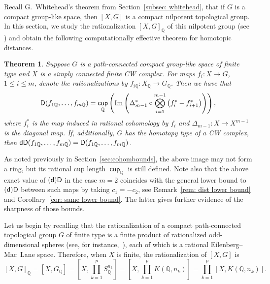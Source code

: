 \documentclass[amscd,amssymb,verbatim,10pt]{amsart}
\numberwithin{equation}{section}
\theoremstyle{plain}
\newtheorem{theorem}{Theorem}[section]
\theoremstyle{definition}
\DeclareMathOperator{\cu}{{\mathsf{cup}}}
\def\Im{\protect\operatorname{Im}}
\def\Q{{\mathbb Q}}
\newcommand{\D}{{\sf {D}}}
\newcommand{\sd}{{(\sf {d})}}
\newcommand{\dD}{{\sf {dD}}}
\begin{document}
Recall G.~Whitehead's theorem from Section~\ref{subsec: whitehead}, that if $G$ is a compact group-like space, then $[X,G]$ is a compact nilpotent topological group. In this section, we study the rationalization $[X,G]_{\Q}$ of this nilpotent group (see \cite{HMR}) and obtain the following computationally effective theorem for homotopic distances.

\begin{theorem}\label{thm:nilfgstar}
Suppose $G$ is a path-connected compact group-like space of finite type and $X$ is a 
simply connected finite CW complex. For maps $f_i\colon X \to G$, $1\le i \le m$, denote
the rationalizations by $f_{i\Q}\colon X_\Q \to G_\Q$. Then we have that
\[
\D(f_{1\Q},\dots,f_{m\Q})=\cu_{\Q}\left(\Im\left(
\Delta_{m-1}^*\circ \bigotimes_{i=1}^{m-1}\left(f_i^*-f_{i+1}^*\right)\right)
\right),
\]
where 
$f_i^*$ is the map induced in rational cohomology by $f_i$ and 
$\Delta_{m-1}\colon X\to X^{m-1}$ is the diagonal map. If, additionally, $G$ has the 
homotopy type of a CW complex, then $\dD(f_{1\Q},\dots,f_{m\Q})=\D(f_{1\Q},\dots,f_{m\Q})$.
\end{theorem}

As noted previously in Section~\ref{sec:cohombounds}, the above image may not form a ring, but its rational cup length $\cu_\Q$ is still defined. Note also that the above exact value of $\sd\D$ in the case $m=2$ coincides with the general lower bound to $\sd\D$ between such maps by taking $c_1=-c_2$, see Remark~\ref{rem: dist lower bound} and Corollary~\ref{cor: same lower bound}. The latter gives further evidence of the sharpness of those bounds.



Let us begin by recalling that the rationalization of a compact path-connected topological 
group $G$ of finite type is a finite product of rationalized odd-dimensional spheres (see, for instance,~\cite[Section~9.1]{MP}), each of which is a rational Eilenberg--Mac~Lane space. 
Therefore, when $X$ is finite, the rationalization of $[X,G]$ is
\begin{equation}\label{eq:hclassQ}
[X,G]_\Q = \left[X,G_\Q\right] = \left[X,\prod_{k=1}^p S^{n_k}_\Q\right] 
=\left[X,\prod_{k=1}^p K(\Q,n_k)\right] 
= \prod_{k=1}^p \left[X,K(\Q,n_k)\right].
\end{equation}
\end{document}
